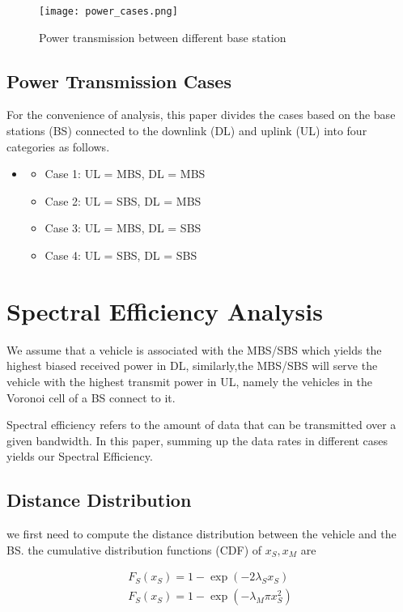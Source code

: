 \documentclass[conference]{IEEEtran}
\begin{document}
\begin{CJK*}{UTF8}{bsmi}
\begin{figure}[htbp]
\centering
\texttt{[image: power\_cases.png]}
\caption{\label{fig:power_cases}Power transmission between different base station}
\end{figure}

\subsection{Power Transmission Cases}
For the convenience of analysis, this paper divides the cases based on the base stations (BS) connected to the downlink (DL) and uplink (UL) into four categories as follows.
\begin{itemize}
    \item[]
    \begin{itemize}
        \item Case 1: UL = MBS, DL = MBS
        \item Case 2: UL = SBS, DL = MBS
        \item Case 3: UL = MBS, DL = SBS
        \item Case 4: UL = SBS, DL = SBS
    \end{itemize}
\end{itemize}


\section{Spectral Efficiency Analysis}
We assume that a vehicle is associated with the MBS/SBS which yields the highest biased received power in DL, similarly,the MBS/SBS will serve the vehicle with the highest transmit power in UL, namely the vehicles in the Voronoi cell of a BS connect to it.
\par Spectral efficiency refers to the amount of data that can be transmitted over a given bandwidth. In this paper, summing up the data rates in different cases yields our Spectral Efficiency.


\subsection{Distance Distribution}

we first need to compute the distance distribution between the vehicle and the BS. the cumulative distribution functions (CDF) of $x_S, x_M$ are

\begin{equation}
\begin{aligned}
F_S(x_S)=1-\exp(-2\lambda_S x_S)\\
F_S(x_S)=1-\exp(-\lambda_M \pi x_S^2)
\end{aligned}
\end{equation}



\end{CJK*}
\end{document}
